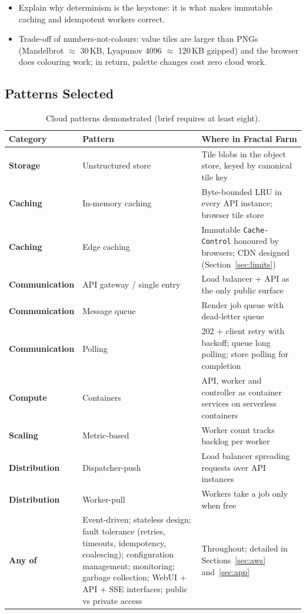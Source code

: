 \documentclass[a4paper,12pt]{article}
\begin{document}
\begin{yourwriting}
\begin{itemize}
    \item Explain why determinism is the keystone: it is what makes immutable caching and idempotent workers correct.
    \item Trade-off of numbers-not-colours: value tiles are larger than PNGs (Mandelbrot $\approx$ 30\,KB, Lyapunov 4096 $\approx$ 120\,KB gzipped) and the browser does colouring work; in return, palette changes cost zero cloud work.
\end{itemize}
\end{yourwriting}

\subsection{Patterns Selected}

\begin{table}[H]
\centering
\small
\begin{tabularx}{\linewidth}{>{\bfseries}p{3.0cm} >{\raggedright\arraybackslash}p{3.4cm} X}
\toprule
Category & Pattern & Where in Fractal Farm \\
\midrule
Storage & Unstructured store & Tile blobs in the object store, keyed by canonical tile key \\
Caching & In-memory caching & Byte-bounded LRU in every API instance; browser tile store \\
Caching & Edge caching & Immutable \texttt{Cache-Control} honoured by browsers; CDN designed (Section~\ref{sec:limits}) \\
Communication & API gateway / single entry & Load balancer + API as the only public surface \\
Communication & Message queue & Render job queue with dead-letter queue \\
Communication & Polling & 202 + client retry with backoff; queue long polling; store polling for completion \\
Compute & Containers & API, worker and controller as container services on serverless containers \\
Scaling & Metric-based & Worker count tracks backlog per worker \\
Distribution & Dispatcher-push & Load balancer spreading requests over API instances \\
Distribution & Worker-pull & Workers take a job only when free \\
Any of & Event-driven; stateless design; fault tolerance (retries, timeouts, idempotency, coalescing); configuration management; monitoring; garbage collection; WebUI + API + SSE interfaces; public vs private access & Throughout; detailed in Sections~\ref{sec:aws} and~\ref{sec:app} \\
\bottomrule
\end{tabularx}
\caption{Cloud patterns demonstrated (brief requires at least eight).}
\label{tab:patterns}
\end{table}
\end{document}

